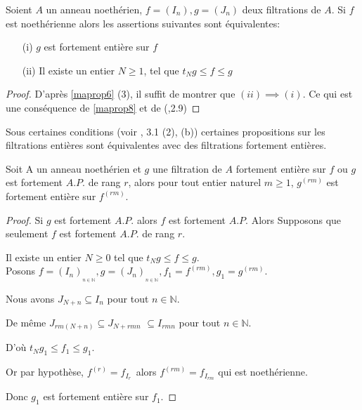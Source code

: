 \begin{maproposition}
	\label{maprop10}
	Soient $A$ un anneau noethérien, $f=(I_n) , g=(J_n)$ deux filtrations de $A$. Si $f$ est noethérienne alors les assertions suivantes sont équivalentes:
	\begin{enumerate}
		\item[(i)] $g$ est fortement entière sur $f$
		\item[(ii)] Il existe un entier $N \geqslant 1$, tel que $t_Ng \leqslant f \leqslant g$
	\end{enumerate}
\end{maproposition}
\begin{proof}
	D'après \ref{maprop6} (3), il suffit de montrer que $(ii) \implies (i)$. Ce qui est une conséquence de \ref{maprop8} et de (\cite{Ok},2.9)
\end{proof}
\begin{maremarque}
	\label{maprop12}
	Sous certaines conditions (voir \cite{Di1}, 3.1 (2), (b)) certaines propositions sur les filtrations entières sont équivalentes avec des filtrations fortement entières. 
\end{maremarque}
\begin{maproposition}
	Soit A un anneau noethérien et $g$ une filtration de $A$ fortement entière sur $f$ ou $g$ est fortement $A.P.$ de rang $r$, alors pour tout entier naturel $m \geqslant 1$, $g^{(rm)}$ est fortement entière sur $f^{(rm)}$.  
\end{maproposition}
\begin{proof}
	Si $g$ est fortement $A.P.$ alors $f$ est fortement $A.P.$
	Alors Supposons que seulement $f$ est fortement $A.P.$ de rang $r.$
	
	Il existe un entier $N\geq 0$ tel que $t_{N}g\leq f\leq g.$\\
	Posons $f=(I_{n})_{_{n\in \mathbb{N}}},g=(J_{n})_{_{n\in \mathbb{N}}},f_{1}=f^{(rm)},g_{1}=g^{(rm)}.$
	
	Nous avons $J_{N+n}\subseteq I_{n}$ pour tout $n\in \mathbb{N}.$
	
	De même $J_{rm(N+n)}\subseteq J_{N+rmn}$ $\subseteq I_{rmn}$  pour tout $n\in \mathbb{N}.$
	
	D'où $t_{N}g_{1}\leq f_{1}\leq g_{1}.$
	
	Or par hypothèse, $f^{(r)}=f_{I_{r}\text{ }}$alors $f^{(rm)}=f_{I_{rm}}$ qui est noethérienne.
	
	Donc $g_{1}$ est fortement entière sur $f_{1}.$
\end{proof}

